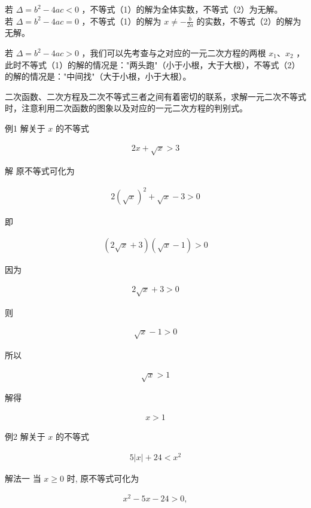 \documentclass[10pt]{article}
\begin{document}
若 $\Delta=b^{2}-4 a c<0$ ，不等式（1）的解为全体实数，不等式（2）为无解。\\
若 $\Delta=b^{2}-4 a c=0$ ，不等式（1）的解为 $x \neq-\frac{b}{2 a}$ 的实数，不等式（2）的解为无解。

若 $\Delta=b^{2}-4 a c>0$ ，我们可以先考查与之对应的一元二次方程的两根 $x_{1} 、 x_{2}$ ，此时不等式（1）的解的情况是："两头跑"（小于小根，大于大根），不等式（2）的解的情况是："中间找"（大于小根，小于大根）。

二次函数、二次方程及二次不等式三者之间有着密切的联系，求解一元二次不等式时，注意利用二次函数的图象以及对应的一元二次方程的判别式。

例1 解关于 $x$ 的不等式

\begin{align*}
2 x+\sqrt{x}>3
\end{align*}

解 原不等式可化为

\begin{align*}
2(\sqrt{x})^{2}+\sqrt{x}-3>0
\end{align*}

即

\begin{align*}
(2 \sqrt{x}+3)(\sqrt{x}-1)>0
\end{align*}

因为

\begin{align*}
2 \sqrt{x}+3>0
\end{align*}

则

\begin{align*}
\sqrt{x}-1>0
\end{align*}

所以

\begin{align*}
\sqrt{x}>1
\end{align*}

解得

\begin{align*}
x>1
\end{align*}

例2 解关于 $x$ 的不等式

\begin{align*}
5|x|+24<x^{2}
\end{align*}

解法一 当 $x \geqslant 0$ 时, 原不等式可化为

\begin{align*}
x^{2}-5 x-24>0,
\end{align*}
\end{document}
